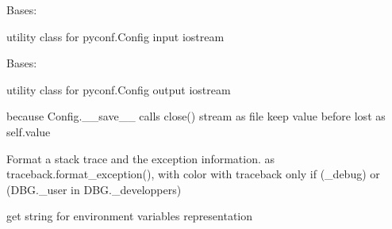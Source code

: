 \documentclass[a4paper,10pt,english]{sphinxmanual}
\begin{document}
\begin{fulllineitems}
\label{\detokenize{apidoc_src/src:src.debug.InStream}}
Bases: 

utility class for pyconf.Config input iostream

\end{fulllineitems}


\begin{fulllineitems}
\label{\detokenize{apidoc_src/src:src.debug.OutStream}}
Bases: 

utility class for pyconf.Config output iostream

\begin{fulllineitems}
\label{\detokenize{apidoc_src/src:src.debug.OutStream.close}}
because Config.\_\_save\_\_ calls close() stream as file
keep value before lost as self.value

\end{fulllineitems}


\end{fulllineitems}


\begin{fulllineitems}
\label{\detokenize{apidoc_src/src:src.debug.format_color_exception}}
Format a stack trace and the exception information.
as traceback.format\_exception(), with color
with traceback only if (\_debug) or (DBG.\_user in DBG.\_developpers)

\end{fulllineitems}


\begin{fulllineitems}
\label{\detokenize{apidoc_src/src:src.debug.getLocalEnv}}
get string for environment variables representation

\end{fulllineitems}
\end{document}
